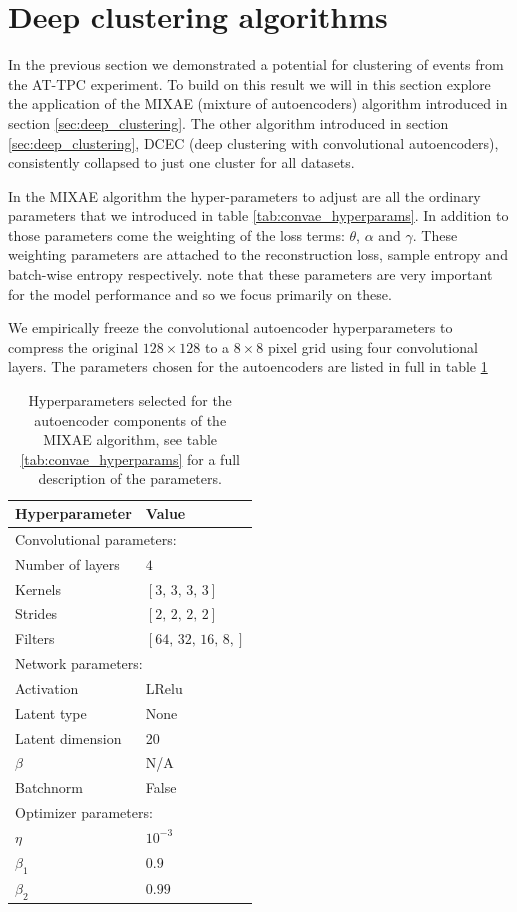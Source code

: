\section{Deep clustering algorithms}\label{sec:convae_clustering}

In the previous section we demonstrated a potential for clustering of events from the AT-TPC experiment. To build on this result we will in this section explore the application of the MIXAE (mixture of autoencoders) algorithm introduced in section \ref{sec:deep_clustering}. The other algorithm introduced in section \ref{sec:deep_clustering}, DCEC (deep clustering with convolutional autoencoders), consistently collapsed to just one cluster for all datasets.

In the MIXAE algorithm the hyper-parameters to adjust are all the ordinary parameters that we introduced in table \ref{tab:convae_hyperparams}. In addition to those parameters come the weighting of the loss terms: $\theta$, $\alpha$ and $\gamma$. These weighting parameters are attached to the reconstruction loss, sample entropy and batch-wise entropy respectively. \cite{Zhang} note that these parameters are very important for the model performance and so we focus primarily on these. 

We empirically freeze the convolutional autoencoder hyperparameters to compress the original $128 \times 128$ to a $8 \times 8$ pixel grid using four convolutional layers. The parameters chosen for the autoencoders are listed in full in table \ref{tab:mixe_ae_hyperparams} 


\begin{table}[H]
\centering
\caption{Hyperparameters selected for the autoencoder components of the MIXAE algorithm, see table \ref{tab:convae_hyperparams} for a full description of the parameters.}\label{tab:mixe_ae_hyperparams}
\setlength{\extrarowheight}{15pt}
\hspace*{-0.5in}
\begin{tabular}{ll}
\toprule
Hyperparameter & Value \\
\midrule
\multicolumn{2}{l}{Convolutional parameters: } \\
\midrule
Number of layers & $4$ \\
Kernels & $[3,\,3,\,3,\,3]$\\
Strides & $[2,\,2,\,2,\,2]$ \\
Filters & $[64,\, 32, \,16, \,8,]$ \\ 
\midrule
\multicolumn{2}{l}{Network parameters: } \\
\midrule
Activation & LRelu \\
Latent type & None \\
Latent dimension & 20  \\
$\beta$ & N/A \\
Batchnorm & False \\
\midrule
\multicolumn{2}{l}{Optimizer parameters: } \\
\midrule
$\eta$ & $10^{-3}$ \\
$\beta_1$ & $0.9$ \\
$\beta_2$ & $0.99$ \\
\bottomrule
\end{tabular}
\end{table}

